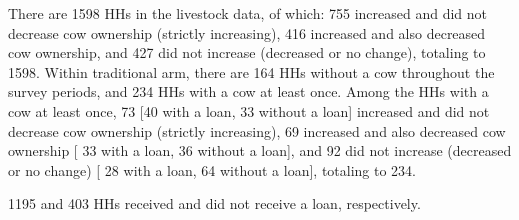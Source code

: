 There are 1598 HHs in the livestock data, of which: 755 increased and did not decrease cow ownership (strictly increasing), 416 increased and also decreased cow ownership, and 427 did not increase (decreased or no change), totaling to 1598. Within \textsf{traditional} arm, there are 164 HHs without a cow throughout the survey periods, and 234 HHs with a cow at least once. Among the HHs with a cow at least once, 
73 
[40 with a loan, 
33 without a loan] 
increased and did not decrease cow ownership (strictly increasing), 
69 increased and also decreased cow ownership [
33 with a loan, 
36 without a loan], and 
92 did not increase (decreased or no change) [
28 with a loan, 
64 without a loan], 
totaling to 
234.

1195 and 403 HHs received and did not receive a loan, respectively.


